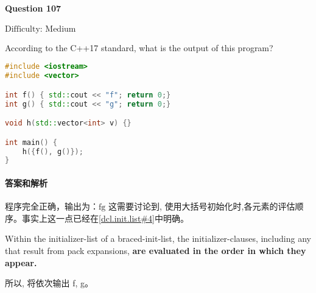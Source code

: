 \documentclass{article}
\begin{document}
	\paragraph*{Question 107} $\boxed{\text{Difficulty: Medium}} $			
	
	According to the C++17 standard, what is the output of this program?
	
	\begin{lstlisting}[language=C++]  		
#include <iostream>
#include <vector>

int f() { std::cout << "f"; return 0;}
int g() { std::cout << "g"; return 0;}

void h(std::vector<int> v) {}

int main() {
	h({f(), g()});
}
	\end{lstlisting}
	
	\paragraph*{答案和解析} $\boxed{\text{程序完全正确，输出为：fg}} $
	这需要讨论到, 使用大括号初始化时,各元素的评估顺序。事实上这一点已经在\href{https://timsong-cpp.github.io/cppwp/n4659/dcl.init.list#4}{[dcl.init.list\#4]}中明确。
	
	\begin{lightgrayleftbar}
		Within the initializer-list of a braced-init-list, the initializer-clauses, including any that result from pack expansions, \textbf{are evaluated in the order in which they appear.}
	\end{lightgrayleftbar}

	所以, 将依次输出 f, g。
	
\end{document}
